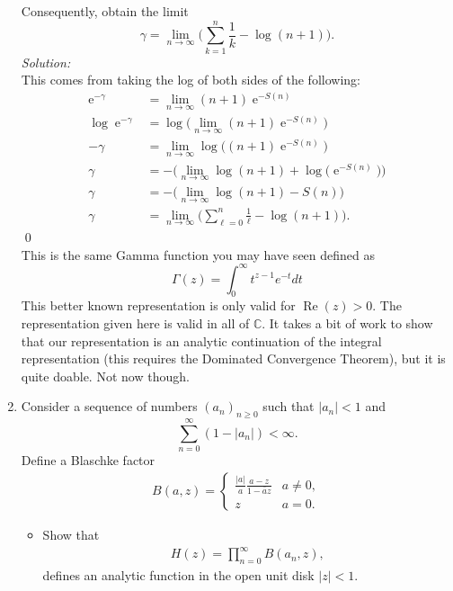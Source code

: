\documentclass[10pt]{amsart}
\DeclareMathOperator{\E}{e}
\theoremstyle{nonumberplain}
\begin{document}
\begin{enumerate}[label={\bf {\arabic*}:}]
\noindent
Consequently, obtain the limit
$$
\gamma = \lim_{n\rightarrow\infty} \Bigg(  \sum_{k=1}^n \frac 1 k - \log(n + 1)  \Bigg).
$$
\textit{Solution:} \\
This comes from taking the log of both sides of the following:
\begin{align*}
\E^{-\gamma} &= \lim_{n\rightarrow\infty} (n + 1) \E^{-S(n)} \\
\log \E^{-\gamma} &= \log\big( \lim_{n\rightarrow\infty} (n + 1) \E^{-S(n)} \big) \\
-\gamma &= \lim_{n\rightarrow\infty} \log\big( (n + 1) \E^{-S(n)} \big) \\
\gamma &= - \bigg(\lim_{n\rightarrow\infty} \log (n + 1) + \log \big(\E^{-S(n)}\big) \bigg) \\
\gamma &= - \bigg(\lim_{n\rightarrow\infty} \log (n + 1) - S(n) \bigg) \\
\gamma &= \lim_{n\rightarrow\infty} \Bigg (\sum_{\ell = 0}^n \frac 1 \ell - \log (n + 1) \Bigg ).
\end{align*} \qed \\

\noindent
This is the same Gamma function you may have seen defined as
$$
\Gamma(z)=\int_0^{\infty} t^{z-1} e^{-t} d t
$$
This better known representation is only valid for
$\operatorname{Re}(z)>0$. The representation given here is valid in
all of $\mathbb{C}$. It takes a bit of work to show that our
representation is an analytic continuation of the integral
representation (this requires the Dominated Convergence Theorem), but
it is quite doable. Not now though. \\
\newpage

\item Consider a sequence of numbers $(a_n)_{n \geq 0}$ such that $|a_n| < 1$ and
$$ \sum_{n = 0}^\infty (1 - |a_n|) < \infty. $$
Define a Blaschke factor
\begin{align*}
B(a,z) =
	\begin{cases}
		\frac{|a|}{a} \frac{ a - z}{ 1 - \bar a z} & a \neq 0,\\
  		z & a  =0.
  	\end{cases}
\end{align*}
\begin{itemize}
\item Show that
\begin{align*}
H(z) = \prod_{n=0}^\infty B(a_n,z),
\end{align*}
defines an analytic function in the open unit disk $|z| < 1$. \\


\end{itemize}
\end{enumerate}
\end{document}
